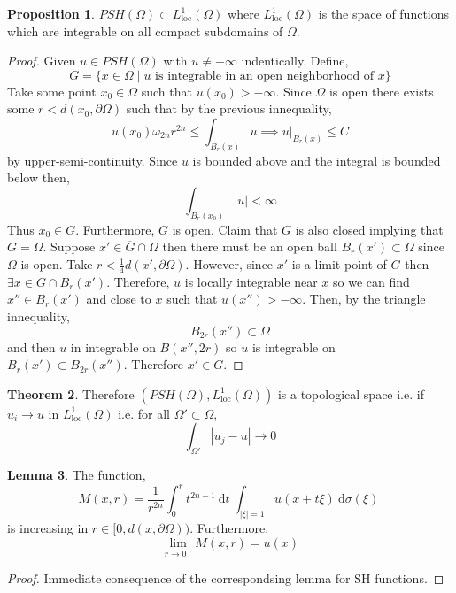 \documentclass[12pt]{extarticle}
\renewcommand{\d}[1]{\: \mathrm{d}#1 \:}
\theoremstyle{definition}
\newtheorem{theorem}{Theorem}[section]
\newtheorem{lemma}[theorem]{Lemma}
\newtheorem{proposition}[theorem]{Proposition}
\begin{document}
\begin{proposition}
$PSH(\Omega) \subset L^1_{\text{loc}}(\Omega)$ where $L^1_{\text{loc}}(\Omega)$ is the space of functions which are integrable on all compact subdomains of $\Omega$.
\end{proposition}

\begin{proof}
Given $u \in PSH(\Omega)$ with $u \neq - \infty$ indentically. Define,
\[ G = \{ x \in \Omega \mid u \text{ is integrable in an open neighborhood of } x \} \] 
Take some point $x_0 \in \Omega$ such that $u(x_0) > - \infty$. Since $\Omega$ is open there exists some $r < d(x_0, \partial \Omega)$ such that by the previous innequality,
\[ u(x_0)\omega_{2n} r^{2n} \le \int_{B_r(x)} u \implies u |_{B_r(x)} \le C \]
by upper-semi-continuity. Since $u$ is bounded above and the integral is bounded below then,
\[ \int_{B_r(x_0)} |u| < \infty \]
Thus $x_0 \in G$. Furthermore, $G$ is open. Claim that $G$ is also closed implying that $G = \Omega$. Suppose $x' \in \overline{G} \cap \Omega$ then there must be an open ball $B_r(x') \subset \Omega$ since $\Omega$ is open. Take $r < \tfrac{1}{4} d(x', \partial \Omega)$. However, since $x'$ is a limit point of $G$ then $\exists x \in G \cap B_r(x')$. Therefore, $u$ is locally integrable near $x$ so we can find $x'' \in B_r(x')$ and close to $x$ such that $u(x'') > - \infty$. Then, by the triangle innequality,
\[ B_{2r}(x'') \subset \Omega \]
and then $u$ in integrable on $B(x'', 2r)$ so $u$ is integrable on $B_r(x') \subset B_{2r}(x'')$. Therefore $x' \in G$. 
\end{proof}

\begin{theorem}
Therefore $(PSH(\Omega), L^1_{\text{loc}}(\Omega))$ is a topological space i.e. if $u_i \to u$ in $L^1_{\text{loc}}(\Omega)$ i.e. for all $\Omega' \subset \Omega$,
\[ \int_{\Omega'} |u_j - u | \to 0 \]
\end{theorem}

\begin{lemma}
The function,
\[ M(x, r) = \frac{1}{r^{2n}} \int_0^r t^{2n - 1} \d{t} \int_{|\xi| = 1} u(x + t \xi) \d{\sigma(\xi)} \]
is increasing in $r \in [0, d(x, \partial \Omega))$. Furthermore,
\[ \lim_{r \to 0^{+}} M(x, r) = u(x) \] 
\end{lemma}

\begin{proof}
Immediate consequence of the correspondsing lemma for SH functions. 
\end{proof}
\end{document}

